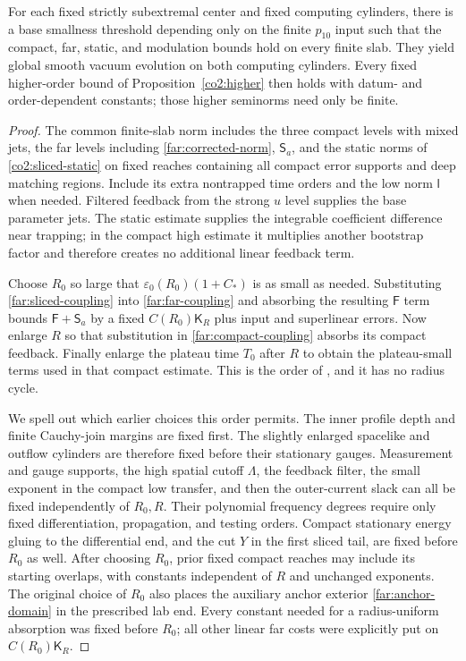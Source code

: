 \begin{proposition}\label{far:closure}
For each fixed strictly subextremal center and fixed computing cylinders,
there is a base smallness threshold depending only on the finite
$p_{10}$ input such that the compact, far, static, and modulation bounds
hold on every finite slab.  They yield global smooth vacuum evolution
on both computing cylinders.  Every fixed higher-order bound of
Proposition~\ref{co2:higher} then holds with datum- and order-dependent
constants; those higher seminorms need only be finite.
\end{proposition}

\begin{proof}
The common finite-slab norm includes the three compact levels with
mixed jets, the far levels including \eqref{far:corrected-norm},
$\mathsf S_a$, and the static norms of \eqref{co2:sliced-static}
on fixed reaches containing all compact error supports and deep
matching regions.  Include its extra nontrapped time orders and the
low norm $\mathsf l$ when needed.  Filtered feedback from the strong
$u$ level supplies the base parameter jets.  The static estimate
supplies the integrable coefficient difference near trapping; in the
compact high estimate it multiplies another bootstrap factor and
therefore creates no additional linear feedback term.

Choose $R_0$ so large that
$\varepsilon_0(R_0)(1+C_*)$ is as small as needed.  Substituting
\eqref{far:sliced-coupling} into \eqref{far:far-coupling} and absorbing
the resulting $\mathsf F$ term bounds $\mathsf F+\mathsf S_a$ by a fixed
$C(R_0)\mathsf K_R$ plus input and superlinear errors.  Now enlarge $R$
so that substitution in \eqref{far:compact-coupling} absorbs its compact
feedback.  Finally enlarge the plateau time $T_0$ after $R$ to obtain
the plateau-small terms used in that compact estimate.  This is the
order of , and it has no radius cycle.

We spell out which earlier choices this order permits.  The inner
profile depth and finite Cauchy-join margins are fixed first.  The
slightly enlarged spacelike and outflow cylinders are therefore fixed
before their stationary gauges.  Measurement and gauge supports, the
high spatial cutoff $\Lambda$, the feedback filter, the small exponent
in the compact low transfer, and then the outer-current slack can all
be fixed independently of $R_0,R$.  Their polynomial frequency degrees
require only fixed differentiation, propagation, and testing orders.
Compact stationary energy gluing to the differential end, and the cut
$Y$ in the first sliced tail, are fixed before $R_0$ as well.
After choosing $R_0$, prior fixed compact reaches may include its
starting overlaps, with constants independent of $R$ and unchanged
exponents.  The original choice of $R_0$ also places the auxiliary
anchor exterior \eqref{far:anchor-domain} in the prescribed lab end.
Every constant needed for a radius-uniform absorption was fixed before
$R_0$; all other linear far costs were explicitly put on
$C(R_0)\mathsf K_R$.


\end{proof}
